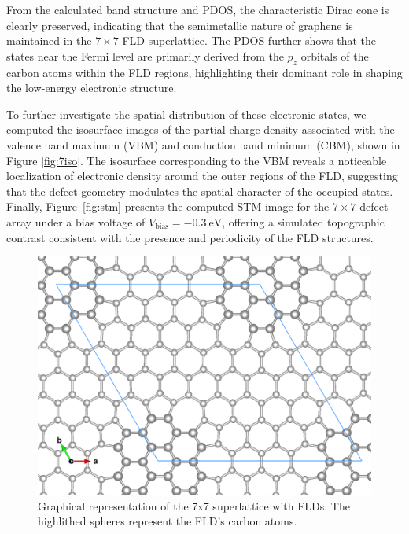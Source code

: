 \documentclass{article}
\begin{document}
From the calculated band structure and PDOS, the characteristic Dirac cone is clearly preserved, indicating that the semimetallic nature of graphene is maintained in the $7 \times 7$ FLD superlattice. The PDOS further shows that the states near the Fermi level are primarily derived from the $p_z$ orbitals of the carbon atoms within the FLD regions, highlighting their dominant role in shaping the low-energy electronic structure.

To further investigate the spatial distribution of these electronic states, we computed the isosurface images of the partial charge density associated with the valence band maximum (VBM) and conduction band minimum (CBM), shown in Figure \ref{fig:7iso}. The isosurface corresponding to the VBM reveals a noticeable localization of electronic density around the outer regions of the FLD, suggesting that the defect geometry modulates the spatial character of the occupied states. Finally, Figure~\ref{fig:stm} presents the computed STM image for the $7 \times 7$ defect array under a bias voltage of $V_{\text{bias}} = -0.3~\text{eV}$, offering a simulated topographic contrast consistent with the presence and periodicity of the FLD structures.

\begin{figure}[H]
  \centering
  \includegraphics[scale=0.2]{../figures/7x7_FLD.png}
  \caption{Graphical representation of the 7x7 superlattice with FLDs. The highlithed spheres represent the FLD's carbon atoms.}
  \label{fig:system}
\end{figure}
\end{document}
